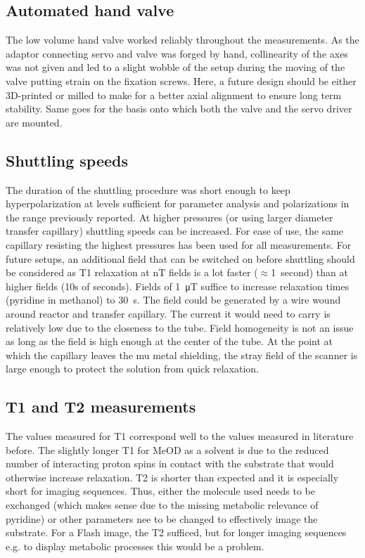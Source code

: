         \subsection{Automated hand valve}
            The low volume hand valve worked reliably throughout the measurements. As the adaptor connecting servo and valve was forged by hand, collinearity of the axes was not given and led to a slight wobble of the setup during the moving of the valve putting strain on the fixation screws. Here, a future design should be either 3D-printed or milled to make for a better axial alignment to ensure long term stability. Same goes for the basis onto which both the valve and the servo driver are mounted. 
        \subsection{Shuttling speeds}
        The duration of the shuttling procedure was short enough to keep hyperpolarization at levels sufficient for parameter analysis and polarizations in the range previously reported. At higher pressures (or using larger diameter transfer capillary) shuttling speeds can be increased. For ease of use, the same capillary resisting the highest pressures has been used for all measurements. For future setups, an additional field that can be switched on before shuttling should be considered as T1 relaxation at \si{\nano\tesla} fields is a lot faster ($\approx$\SI{1}{second}) than at higher fields (10s of seconds). Fields of \SI{1}{\micro\tesla} suffice to increase relaxation times (pyridine in methanol) to \SI{30}{\second}. The field could be generated by a wire wound around reactor and transfer capillary. The current it would need to carry is relatively low due to the closeness to the tube. Field homogeneity is not an issue as long as the field is high enough at the center of the tube. At the point at which the capillary leaves the mu metal shielding, the stray field of the scanner is large enough to protect the solution from quick relaxation.
        \subsection{T1 and T2 measurements}
        The values measured for T1 correspond well to the values measured in literature before. The slightly longer T1 for MeOD as a solvent is due to the reduced number of interacting proton spins in contact with the substrate that would otherwise increase relaxation. T2 is shorter than expected and it is especially short for imaging sequences. Thus, either the molecule used needs to be exchanged (which makes sense due to the missing metabolic relevance of pyridine) or other parameters nee to be changed to effectively image the substrate. For a Flash image, the T2 sufficed, but for longer imaging sequences e.g. to display  metabolic processes this would be a problem.
